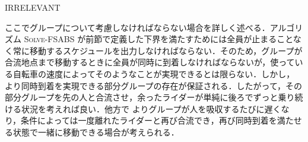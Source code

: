 IRRELEVANT

ここでグループについて考慮しなければならない場合を詳しく述べる．アルゴリズム \textsc{Solve-FSABS} が前節で定義した下界を満たすためには全員が止まることなく常に移動するスケジュールを出力しなければならない．そのため，グループが合流地点まで移動するときに全員が同時に到着しなければならないが，使っている自転車の速度によってそのようなことが実現できるとは限らない．しかし，  より同時到着を実現できる部分グループの存在が保証される．したがって，その部分グループを先の人と合流させ，余ったライダーが単純に後ろでずっと乗り続ける状況を考えれば良い．他方で  よりグループが人を吸収するたびに遅くなり，条件によっては一度離れたライダーと再び合流でき，再び同時到着を満たせる状態で一緒に移動できる場合が考えられる．



